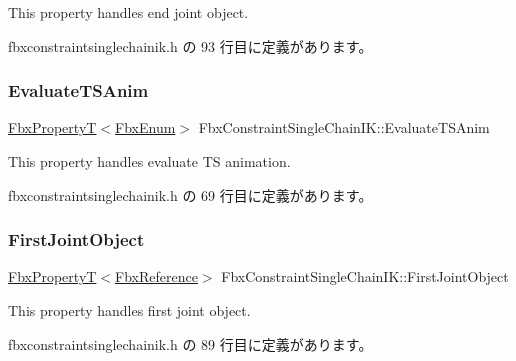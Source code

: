 This property handles end joint object. 

 fbxconstraintsinglechainik.\+h の 93 行目に定義があります。

\mbox{\label{class_fbx_constraint_single_chain_i_k_ae2f5d57a658c12c748ceeccd31809a3f}} 
\subsubsection{\texorpdfstring{Evaluate\+T\+S\+Anim}{EvaluateTSAnim}}
{\footnotesize\ttfamily \hyperlink{class_fbx_property_t}{Fbx\+PropertyT}$<$\hyperlink{fbxtypes_8h_a9a28614cb4272a0ad7d748eda7f3d3e5}{Fbx\+Enum}$>$ Fbx\+Constraint\+Single\+Chain\+I\+K\+::\+Evaluate\+T\+S\+Anim}

This property handles evaluate TS animation. 

 fbxconstraintsinglechainik.\+h の 69 行目に定義があります。

\mbox{\label{class_fbx_constraint_single_chain_i_k_ad33341677c0cf0689bcbc1f4e4eda23a}} 
\subsubsection{\texorpdfstring{First\+Joint\+Object}{FirstJointObject}}
{\footnotesize\ttfamily \hyperlink{class_fbx_property_t}{Fbx\+PropertyT}$<$\hyperlink{fbxtypes_8h_a44df6a2eec915cf27cd481e5c5e48a24}{Fbx\+Reference}$>$ Fbx\+Constraint\+Single\+Chain\+I\+K\+::\+First\+Joint\+Object}

This property handles first joint object. 

 fbxconstraintsinglechainik.\+h の 89 行目に定義があります。

\mbox{\label{class_fbx_constraint_single_chain_i_k_a0fb576e54a64caab8e6609060e020ae2}} 
